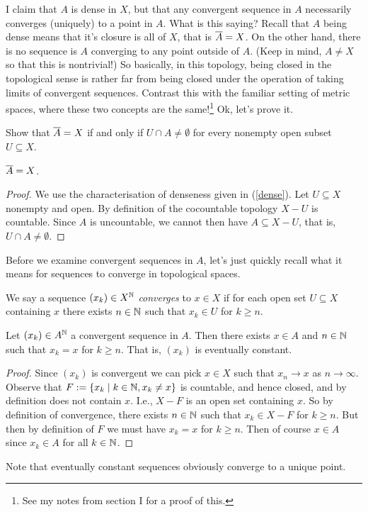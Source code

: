\begin{nothing}
  I claim that $A$ is dense in $X$, but that any convergent sequence in
  $A$ necessarily converges (uniquely) to a point in $A$. What is this
  saying? Recall that $A$ being dense means that it's closure is all of
  $X$, that is $\overline A = X$. On the other hand, there is no sequence
  is $A$ converging to any point outside of $A$. (Keep in mind, $A \ne
  X$ so that this is nontrivial!) So basically, in this topology, being
  closed in the topological sense is rather far from being closed under
  the operation of taking limits of convergent sequences. Contrast this
  with the familiar setting of metric spaces, where these two concepts
  are the same!\footnote{See my notes from section I for a proof of
    this.} Ok, let's prove it.
\end{nothing}
\begin{exercise}
  \label{dense}
  Show that $\overline A = X$ if and only if $U \cap A \ne \emptyset$ for
  every nonempty open subset $U \subseteq X$.
\end{exercise}

\begin{lemma}
  $\overline A = X$.
\end{lemma}

\begin{proof}
  We use the characterisation of denseness given in (\ref{dense}). Let
  $U \subseteq X$ nonempty and open. By definition of the cocountable
  topology $X - U$ is countable. Since $A$ is uncountable, we cannot
  then have $A \subseteq X - U$, that is, $U \cap A \ne \emptyset$.
\end{proof}

Before we examine convergent sequences in $A$, let's just quickly
recall what it means for sequences to converge in topological spaces.

\begin{definition}
  We say a sequence $(x_k) \in X^{\mathbb{N}}$ \textit{converges} to $x \in X$
  if for each open set $U \subseteq X$ containing $x$ there exists $n
  \in \mathbb{N}$ such that $x_k \in U$ for $k \ge n$.
\end{definition}

\begin{lemma}
  Let $(x_k) \in A^{\mathbb{N}}$ a convergent sequence in $A$. Then there exists
  $x \in A$ and $n \in \mathbb{N}$ such that $x_k = x$ for $k \ge n$. That is,
  $(x_k)$ is \textup{eventually constant}.
\end{lemma}

\begin{proof}
  Since $(x_k)$ is convergent we can pick $x \in X$ such that $x_n \to
  x$ as $n \to \infty$. Observe that $F \mathrel{:=} \{x_k \mid k \in \mathbb{N}, x_k
  \ne x\}$ is countable, and hence closed, and by definition does not
  contain $x$. I.e., $X - F$ is an open set containing $x$. So by
  definition of convergence, there exists $n \in \mathbb{N}$ such that $x_k
  \in X - F$ for $k \ge n$. But then by definition of $F$ we must have
  $x_k = x$ for $k \ge n$. Then of course $x \in A$ since $x_k \in A$
  for all $k \in \mathbb{N}$.
\end{proof}

Note that eventually constant sequences obviously converge to a unique
point.





